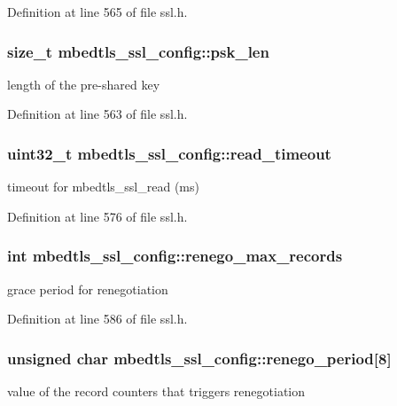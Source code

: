 Definition at line 565 of file ssl.\-h.

\hypertarget{structmbedtls__ssl__config_ad45c9414cf24c068f0cae76dfe793bdf}{
\subsubsection[{psk\-\_\-len}]{\setlength{\rightskip}{0pt plus 5cm}size\-\_\-t mbedtls\-\_\-ssl\-\_\-config\-::psk\-\_\-len}}\label{structmbedtls__ssl__config_ad45c9414cf24c068f0cae76dfe793bdf}
length of the pre-\/shared key 

Definition at line 563 of file ssl.\-h.

\hypertarget{structmbedtls__ssl__config_a8f32ca22ea20b3848176d78390c13153}{
\subsubsection[{read\-\_\-timeout}]{\setlength{\rightskip}{0pt plus 5cm}uint32\-\_\-t mbedtls\-\_\-ssl\-\_\-config\-::read\-\_\-timeout}}\label{structmbedtls__ssl__config_a8f32ca22ea20b3848176d78390c13153}
timeout for mbedtls\-\_\-ssl\-\_\-read (ms) 

Definition at line 576 of file ssl.\-h.

\hypertarget{structmbedtls__ssl__config_a0f2ff6d7f481f9ffaf40025289011a2d}{
\subsubsection[{renego\-\_\-max\-\_\-records}]{\setlength{\rightskip}{0pt plus 5cm}int mbedtls\-\_\-ssl\-\_\-config\-::renego\-\_\-max\-\_\-records}}\label{structmbedtls__ssl__config_a0f2ff6d7f481f9ffaf40025289011a2d}
grace period for renegotiation 

Definition at line 586 of file ssl.\-h.

\hypertarget{structmbedtls__ssl__config_ab1e7273cb7a477f5cb303134055555b0}{
\subsubsection[{renego\-\_\-period}]{\setlength{\rightskip}{0pt plus 5cm}unsigned char mbedtls\-\_\-ssl\-\_\-config\-::renego\-\_\-period\mbox{[}8\mbox{]}}}\label{structmbedtls__ssl__config_ab1e7273cb7a477f5cb303134055555b0}
value of the record counters that triggers renegotiation 

